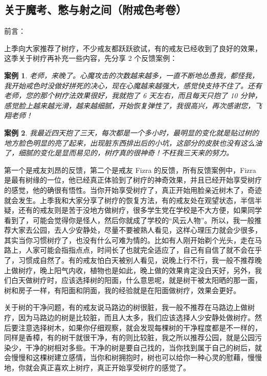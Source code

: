 \documentclass{ctexart}
\newtheorem{case}{案例}
\begin{document}
\subsection{关于魔考、憋与射之间（附戒色考卷）}

前言：

上季向大家推荐了树疗，不少戒友都跃跃欲试，有的戒友已经收到了良好的效果，这季关于树疗再补充一些内容，先分享 2 个反馈案例：

\begin{case}
    老师，来晚了。心魔攻击的次数越来越多，一直不断地怂恿我，都怪我，我开始戒色时没做好拼死的决心，现在心魔越来越强大，感觉快支持不住了。还有老师，您的那个树疗法效果很好，我就抱了 6 天左右，而且每天只抱了 10 分钟，感觉脸上越来越光滑，越来越细腻，开始恢复弹性了，我很高兴，再次感谢您，飞翔老师！
\end{case}

\begin{case}
    我最近四天抱了三天，每次都是一个多小时，最明显的变化就是贴过树的地方脸色明显的亮了起来，出现脏东西排出后的小坑，这部分的皮肤也没有这么油了，细腻的变化是显而易见的，树疗真的很神奇！不枉我三天来的努力。
\end{case}

第一个是戒友刘昂的反馈，第二个是戒友 Fizra 的反馈，所有反馈案例中，Fizra 是最有树缘的一位，他已经真正体验到了树疗的神奇效果，并且已经开始享受树疗的感觉，他的确很有悟性。当你开始享受树疗了，真正开始用脸亲近树木了，奇迹就会发生。上季我和大家分享了树疗的恢复方法，有的戒友处在观望状态，半信半疑，还有的戒友则是苦于没地方做树疗，很多学生党在学校是不大方便，如果同学看到了，可能会觉得你是怪人，然后你就成了学校的“风云人物”。所以，我一般推荐大家去公园，去人少安静处，尽量不要被熟人看见，这样心理压力就会少很多，其实当你习惯树疗了，也没有什么可难为情的。比如有人刚开始剃个光头，走在马路上，人家可能会指指点点，时间长了也就完全适应了，自己有自信了就不会在乎了，习惯成自然了。有的戒友怕白天被别人看见，说晚上行不行，我一般不推荐晚上做树疗，晚上阳气内收，植物也是如此，晚上做的效果肯定没白天好，另外，我们白天做树疗时，应该选择树的阳面，什么意思呢，就是树干被太阳晒的那一面，树和房子一样，有阳面和阴面，我的经验就是在阳面做树疗，效果会更好。

关于树的干净问题，有的戒友说马路边的树很脏，我一般不推荐在马路边上做树疗，因为马路边的树是比较脏，而且人太多，我们应该选择人少安静处做树疗。然后要注意选择树木，如果你仔细观察，就会发现每棵树的干净程度都是不一样的，同样是香樟，有的树干就很干净，有的则比较脏，我之所以推荐公园，就是公园污染少，干净的树相对多些。干净的树是要自己找的，当你找到属于自己的树后，就会慢慢和这棵树建立感情，当你和树拥抱时，树也可以给你一种心灵的慰藉，慢慢地，你就会真正喜欢上树疗，真正开始享受树疗的感觉了。
\end{document}
